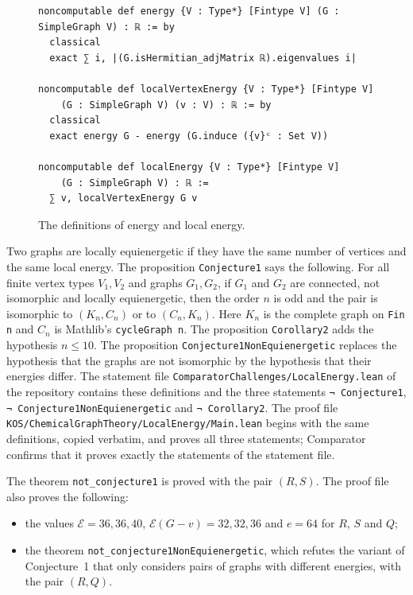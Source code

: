 \documentclass[11pt]{amsart}
\theoremstyle{remark}
\newcommand{\cE}{\mathcal{E}}
\begin{document}
\begin{figure}[t]
\begin{Verbatim}[fontsize=\small,frame=single]
noncomputable def energy {V : Type*} [Fintype V] (G : SimpleGraph V) : ℝ := by
  classical
  exact ∑ i, |(G.isHermitian_adjMatrix ℝ).eigenvalues i|

noncomputable def localVertexEnergy {V : Type*} [Fintype V]
    (G : SimpleGraph V) (v : V) : ℝ := by
  classical
  exact energy G - energy (G.induce ({v}ᶜ : Set V))

noncomputable def localEnergy {V : Type*} [Fintype V]
    (G : SimpleGraph V) : ℝ :=
  ∑ v, localVertexEnergy G v
\end{Verbatim}
\caption{The definitions of energy and local energy.}\label{fig:defs}
\end{figure}

Two graphs are locally equienergetic if they have the same number of vertices and the same local energy.
The proposition \texttt{Conjecture1} says the following.
For all finite vertex types $V_1,V_2$ and graphs $G_1,G_2$, if $G_1$ and $G_2$ are connected, not isomorphic and locally equienergetic, then the order $n$ is odd and the pair is isomorphic to $(K_n,C_n)$ or to $(C_n,K_n)$.
Here $K_n$ is the complete graph on \texttt{Fin n} and $C_n$ is Mathlib's \texttt{cycleGraph n}.
The proposition \texttt{Corollary2} adds the hypothesis $n\le10$.
The proposition \texttt{Conjecture1NonEquienergetic} replaces the hypothesis that the graphs are not isomorphic by the hypothesis that their energies differ.
The statement file \texttt{ComparatorChallenges/LocalEnergy.lean} of the repository contains these definitions and the three statements \mbox{\texttt{¬ Conjecture1}}, \mbox{\texttt{¬ Conjecture1NonEquienergetic}} and \mbox{\texttt{¬ Corollary2}}.
The proof file \texttt{KOS/ChemicalGraphTheory/LocalEnergy/Main.lean} begins with the same definitions, copied verbatim, and proves all three statements; Comparator confirms that it proves exactly the statements of the statement file.

The theorem \mbox{\texttt{not\_conjecture1}} is proved with the pair $(R,S)$.
The proof file also proves the following:
\begin{itemize}
\item the values $\cE=36,36,40$, $\cE(G-v)=32,32,36$ and $e=64$ for $R$, $S$ and $Q$;
\item the theorem \texttt{not\_conjecture1NonEquienergetic}, which refutes the variant of Conjecture~1 that only considers pairs of graphs with different energies, with the pair $(R,Q)$.
\end{itemize}
\end{document}
